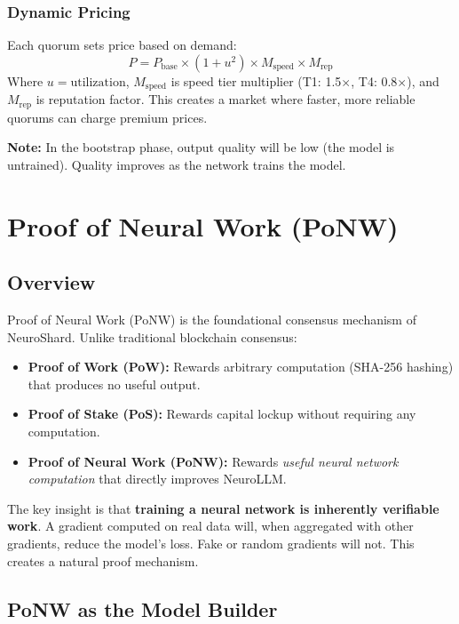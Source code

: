 \documentclass[11pt,a4paper]{article}
\begin{document}
\subsubsection{Dynamic Pricing}
Each quorum sets price based on demand:
\begin{equation}
P = P_{\text{base}} \times (1 + u^2) \times M_{\text{speed}} \times M_{\text{rep}}
\end{equation}
Where $u = \text{utilization}$, $M_{\text{speed}}$ is speed tier multiplier (T1: 1.5$\times$, T4: 0.8$\times$), and $M_{\text{rep}}$ is reputation factor. This creates a market where faster, more reliable quorums can charge premium prices.

\textbf{Note:} In the bootstrap phase, output quality will be low (the model is untrained). Quality improves as the network trains the model.

\section{Proof of Neural Work (PoNW)}

\subsection{Overview}

Proof of Neural Work (PoNW) is the foundational consensus mechanism of NeuroShard. Unlike traditional blockchain consensus:

\begin{itemize}
    \item \textbf{Proof of Work (PoW):} Rewards arbitrary computation (SHA-256 hashing) that produces no useful output.
    \item \textbf{Proof of Stake (PoS):} Rewards capital lockup without requiring any computation.
    \item \textbf{Proof of Neural Work (PoNW):} Rewards \textit{useful neural network computation} that directly improves NeuroLLM.
\end{itemize}

The key insight is that \textbf{training a neural network is inherently verifiable work}. A gradient computed on real data will, when aggregated with other gradients, reduce the model's loss. Fake or random gradients will not. This creates a natural proof mechanism.

\subsection{PoNW as the Model Builder}
\end{document}
